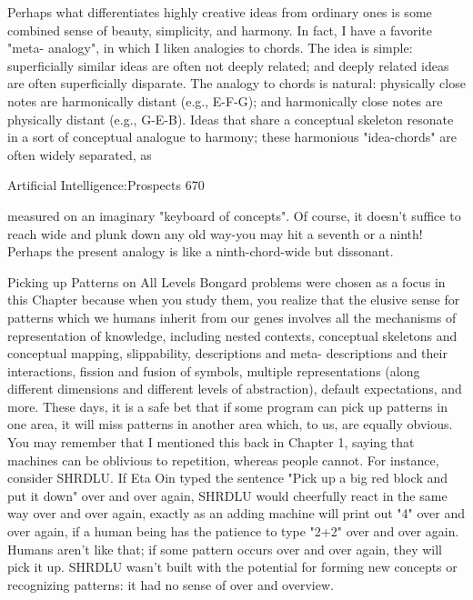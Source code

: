         Perhaps what differentiates highly creative ideas from ordinary ones is some
combined sense of beauty, simplicity, and harmony. In fact, I have a favorite "meta-
analogy", in which I liken analogies to chords. The idea is simple: superficially similar
ideas are often not deeply related; and deeply related ideas are often superficially
disparate. The analogy to chords is natural: physically close notes are harmonically
distant (e.g., E-F-G); and harmonically close notes are physically distant (e.g., G-E-B).
Ideas that share a conceptual skeleton resonate in a sort of conceptual analogue to
harmony; these harmonious "idea-chords" are often widely separated, as




Artificial Intelligence:Prospects                                                       670

measured on an imaginary "keyboard of concepts". Of course, it doesn't suffice to reach
wide and plunk down any old way-you may hit a seventh or a ninth! Perhaps the present
analogy is like a ninth-chord-wide but dissonant.

                         Picking up Patterns on All Levels
Bongard problems were chosen as a focus in this Chapter because when you study them,
you realize that the elusive sense for patterns which we humans inherit from our genes
involves all the mechanisms of representation of knowledge, including nested contexts,
conceptual skeletons and conceptual mapping, slippability, descriptions and meta-
descriptions and their interactions, fission and fusion of symbols, multiple representations
(along different dimensions and different levels of abstraction), default expectations, and
more.
        These days, it is a safe bet that if some program can pick up patterns in one area,
it will miss patterns in another area which, to us, are equally obvious. You may remember
that I mentioned this back in Chapter 1, saying that machines can be oblivious to
repetition, whereas people cannot. For instance, consider SHRDLU. If Eta Oin typed the
sentence "Pick up a big red block and put it down" over and over again, SHRDLU would
cheerfully react in the same way over and over again, exactly as an adding machine will
print out "4" over and over again, if a human being has the patience to type "2+2" over
and over again. Humans aren't like that; if some pattern occurs over and over again, they
will pick it up. SHRDLU wasn't built with the potential for forming new concepts or
recognizing patterns: it had no sense of over and overview.

